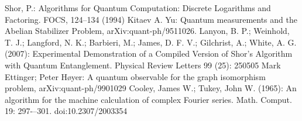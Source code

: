 \documentclass{llncs}
\begin{document}
\begin{thebibliography}{}
    Shor, P.: Algorithms for Quantum Computation:
     Discrete Logarithms and Factoring. FOCS, 124--134 (1994)
    Kitaev A. Yu: Quantum measurements and the
     Abelian Stabilizer Problem, arXiv:quant-ph/9511026.
    Lanyon, B. P.; Weinhold, T. J.; Langford,
     N. K.; Barbieri, M.; James, D. F. V.; Gilchrist, A.; White,
     A. G. (2007): Experimental Demonstration of a Compiled Version
     of Shor's Algorithm with Quantum Entanglement. Physical Review
     Letters 99 (25): 250505      
    Mark Ettinger; Peter Høyer: A quantum
     observable for the graph isomorphism problem, arXiv:quant-ph/9901029 
    Cooley, James W.; Tukey, John W. (1965): An
     algorithm for the machine calculation of complex Fourier
     series. Math. Comput. 19: 297-–301. doi:10.2307/2003354
\end{thebibliography}
\end{document}
